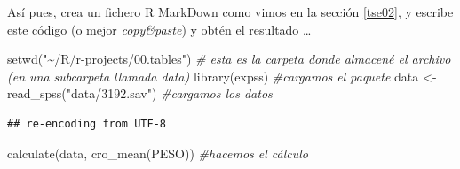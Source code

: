 \documentclass[
]{book}
\newenvironment{Shaded}{\begin{snugshade}}{\end{snugshade}}
\newcommand{\CommentTok}[1]{\textcolor[rgb]{0.56,0.35,0.01}{\textit{#1}}}
\newcommand{\FunctionTok}[1]{\textcolor[rgb]{0.00,0.00,0.00}{#1}}
\newcommand{\NormalTok}[1]{#1}
\newcommand{\OtherTok}[1]{\textcolor[rgb]{0.56,0.35,0.01}{#1}}
\newcommand{\StringTok}[1]{\textcolor[rgb]{0.31,0.60,0.02}{#1}}
\begin{document}
Así pues, crea un fichero R MarkDown como vimos en la sección \ref{tse02}, y escribe este código (o mejor \emph{copy\&paste}) y obtén el resultado \ldots{}

\begin{Shaded}
\begin{Highlighting}[]
\FunctionTok{setwd}\NormalTok{(}\StringTok{"\textasciitilde{}/R/r{-}projects/00.tables"}\NormalTok{)  }\CommentTok{\# esta es la carpeta donde almacené el archivo (en una subcarpeta llamada data)}
\FunctionTok{library}\NormalTok{(expss)  }\CommentTok{\#cargamos el paquete}
\NormalTok{data }\OtherTok{\textless{}{-}} \FunctionTok{read\_spss}\NormalTok{(}\StringTok{"data/3192.sav"}\NormalTok{)  }\CommentTok{\#cargamos los datos}
\end{Highlighting}
\end{Shaded}

\begin{verbatim}
## re-encoding from UTF-8
\end{verbatim}

\begin{Shaded}
\begin{Highlighting}[]
\FunctionTok{calculate}\NormalTok{(data, }\FunctionTok{cro\_mean}\NormalTok{(PESO))  }\CommentTok{\#hacemos el cálculo}
\end{Highlighting}
\end{Shaded}

 
  \providecommand{\huxb}[2]{\arrayrulecolor[RGB]{#1}\global\arrayrulewidth=#2pt}
  \providecommand{\huxvb}[2]{\color[RGB]{#1}\vrule width #2pt}
  \providecommand{\huxtpad}[1]{\rule{0pt}{#1}}
  \providecommand{\huxbpad}[1]{\rule[-#1]{0pt}{#1}}
\end{document}
